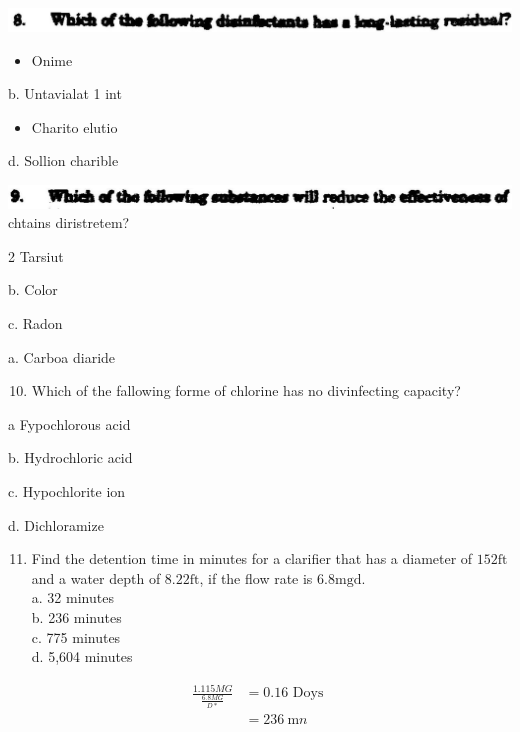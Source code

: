 \documentclass[10pt]{article}
\begin{document}
\includegraphics[max width=\textwidth]{2022_11_11_ca6a6c1a0324ee23e523g-52(3)}

\begin{itemize}
  \item Onime
\end{itemize}

b. Untavialat 1 int

\begin{itemize}
  \item Charito elutio
\end{itemize}

d. Sollion charible

\includegraphics[max width=\textwidth]{2022_11_11_ca6a6c1a0324ee23e523g-52(4)}\\
chtains diristretem?

2 Tarsiut

b. Color

c. Radon

a. Carboa diaride

\begin{enumerate}
  \setcounter{enumi}{9}
  \item Which of the fallowing forme of chlorine has no divinfecting capacity?
\end{enumerate}

a Fypochlorous acid

b. Hydrochloric acid

c. Hypochlorite ion

d. Dichloramize

\begin{enumerate}
  \setcounter{enumi}{10}
  \item Find the detention time in minutes for a clarifier that has a diameter of $152 \mathrm{ft}$ and a water depth of $8.22 \mathrm{ft}$, if the flow rate is $6.8 \mathrm{mgd}$.\\
a. 32 minutes\\
b. 236 minutes\\
c. 775 minutes\\
d. 5,604 minutes
\end{enumerate}

$$
\begin{aligned}
\frac{1.115 M G}{\frac{6.8 M G}{D *}} &=0.16 \text { Doys } \\
&=236 \mathrm{~m} n
\end{aligned}
$$
\end{document}
